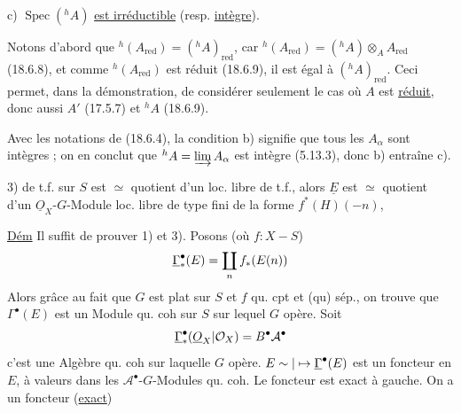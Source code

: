 c) $\operatorname{Spec}({}^h A)$ \uline{est irréductible} (resp. \uline{intègre}).

Notons d'abord que ${}^h(A_{\mathrm{red}})=({}^h A)_{\mathrm{red}}$, car  ${}^h(A_{\mathrm{red}})=({}^h A)\otimes_A A_{\mathrm{red}}$ (18.6.8), et comme ${}^h(A_{\mathrm{red}})$ est réduit (18.6.9), il est égal à $({}^h A)_{\mathrm{red}}$. Ceci permet, dans la démonstration, de considérer seulement le cas où $A$ est \uline{réduit}, donc aussi $A'$ (17.5.7) et ${}^h A$ (18.6.9).

 Avec les notations de (18.6.4), la condition b) signifie que tous les $A_\alpha$ sont intègres ;  on en conclut que ${}^h A=\varinjlim A_\alpha$ est intègre (5.13.3), donc b) entraîne c).



3)   de t.f. sur $S$ est $\simeq$ quotient d'un loc. libre de t.f.,  alors $\underline E$ est $\simeq$ quotient d'un $\underline O_X$-$G$-Module loc. libre de type fini de la forme $f^*(H)(-n)$, 

\uline{Dém} Il suffit de prouver 1) et 3). Posons (où $f:X-S$)
\[
\underline{\Gamma}_{*}^\bullet(E)=\coprod_n f_*(E(n))
\]
Alors grâce au fait que $G$ est plat sur $S$ et $f$ qu. cpt et (qu) sép., on trouve que $\Gamma^\bullet(E)$ est un Module qu. coh sur $S$ sur lequel $G$ opère. Soit
\[
\underline{\Gamma}_{*}^\bullet(\underline O_X|\mathcal O_X)=B^\bullet\mathcal A^\bullet
\]
c'est une Algèbre qu. coh sur laquelle $G$ opère. $E\sim|\mapsto\underline{\Gamma}^\bullet(E)$ est un foncteur en $E$, à valeurs dans les  $\mathcal A^\bullet$-$G$-Modules qu. coh. Le foncteur est exact à gauche. On a un foncteur (\uline{exact})


